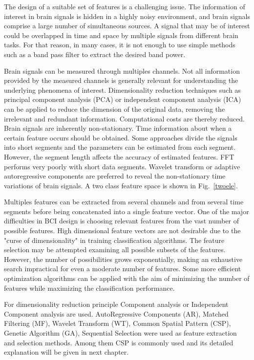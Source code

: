 The design of a suitable set of features is a challenging issue. The information of interest in brain signals is hidden in a highly noisy environment, and brain signals comprise a large number of simultaneous sources. A signal that may be of interest could be overlapped in time and space by multiple signals from different brain tasks. For that reason, in many cases, it is not enough to use simple methods such as a band pass filter to extract the desired band power.

Brain signals can be measured through multiples channels. Not all information provided by the measured channels is generally relevant for understanding the underlying phenomena of interest. Dimensionality reduction techniques such as principal component analysis (PCA) or independent component analysis (ICA) can be applied to reduce the dimension of the original data, removing the irrelevant and redundant information. Computational costs are thereby reduced. Brain signals are inherently non-stationary. Time information about when a certain feature occurs should be obtained. Some approaches divide the signals into short segments and the parameters can be estimated from each segment. However, the segment length affects the accuracy of estimated features. FFT performs very poorly with short data segments. Wavelet transform or adaptive autoregressive components are preferred to reveal the non-stationary time variations of brain signals. A two class feature space is shown in Fig.~\ref{twoele}.

Multiples features can be extracted from several channels and from several time segments before being concatenated into a single feature vector. One of the major difficulties in BCI design is choosing relevant features from the vast number of possible features. High dimensional feature vectors are not desirable due to the "curse of dimensionality" in training classification algorithms. The feature selection may be attempted examining all possible subsets of the features. However, the number of possibilities grows exponentially, making an exhaustive search impractical for even a moderate number of features. Some more efficient optimization algorithms can be applied with the aim of minimizing the number of features while maximizing the classification performance.

For dimensionality reduction principle Component analysis or Independent Component analysis are used. AutoRegressive Components (AR), Matched Filtering (MF), Wavelet Transform (WT), Common Spatial Pattern (CSP), Genetic Algorithm (GA), Sequential Selection were used as feature extraction and selection methods. Among them CSP is commonly used and its detailed explanation will be given  in next chapter.


